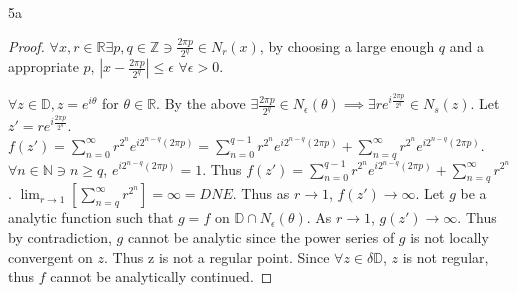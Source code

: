 \documentclass{article}
\newcommand{\R}{\mathbb{R}}
\newcommand{\Z}{\mathbb{Z}}
\newcommand{\N}{\mathbb{N}}
\newcommand{\abs}[1]{\left\lvert #1\right\rvert}
\begin{document}
\bigskip

\begin{PROB}{5a}\label{Problem 5a.}
\end{PROB}
\begin{proof}
    $\forall x, r \in \R \exists p, q \in \Z \ni  \frac{2 \pi p}{2^q} \in N_{r}(x)$, by choosing a large enough $q$ and a appropriate $p$, $\abs{x - \frac{2 \pi p}{2^q}} \leq \epsilon$ $\forall \epsilon > 0$. 
    
    $\forall z \in \mathbb{D}, z = e^{i \theta}$ for $\theta \in \R$. By the above $\exists \frac{2 \pi p}{2^q} \in N_{\epsilon}(\theta) \implies \exists re^{i \frac{2 \pi p}{2^q}} \in N_{s}(z)$. Let $z' = re^{i \frac{2 \pi p}{2^q}}$. $f(z') = \sum_{n = 0}^{\infty} r^{2^n} e^{i 2^{n - q} (2 \pi p)} = \sum_{n = 0}^{q - 1} r^{2^n} e^{i 2^{n - q} (2 \pi p)} + \sum_{n = q}^{\infty} r^{2^n} e^{i 2^{n - q} (2 \pi p)}$. $\forall n \in \N \ni n \geq q$, $e^{i 2^{n - q} (2 \pi p)} = 1$.  Thus $f(z') = \sum_{n = 0}^{q - 1} r^{2^n} e^{i 2^{n - q} (2 \pi p)} + \sum_{n = q}^{\infty} r^{2^n}$. $\lim_{r \to 1} \left[\sum_{n = q}^{\infty} r^{2^n}\right] = \infty = DNE$. Thus as $r \to 1$, $f(z') \to \infty$. Let $g$ be a analytic function such that $g = f$ on $\mathbb{D} \cap N_{\epsilon}(\theta)$. As $r \to 1$, $g(z') \to \infty$. Thus by contradiction, $g$ cannot be analytic since the power series of $g$ is not locally convergent on $z$. Thus z is not a regular point. Since $\forall z \in \delta \mathbb{D}$, $z$ is not regular, thus $f$ cannot be analytically continued.         
\end{proof}

\bigskip
\end{document}
